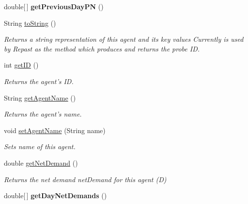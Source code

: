\begin{DoxyCompactItemize}
\item 
\hypertarget{classuk_1_1ac_1_1dmu_1_1iesd_1_1cascade_1_1agents_1_1aggregators_1_1_aggregator_agent_a618520742f384192175c0b895baf9ce1}{double\mbox{[}$\,$\mbox{]} {\bfseries get\-Previous\-Day\-P\-N} ()}\label{classuk_1_1ac_1_1dmu_1_1iesd_1_1cascade_1_1agents_1_1aggregators_1_1_aggregator_agent_a618520742f384192175c0b895baf9ce1}

\item 
String \hyperlink{classuk_1_1ac_1_1dmu_1_1iesd_1_1cascade_1_1agents_1_1aggregators_1_1_aggregator_agent_a7c0306e4c7407892f58fc488b4fed355}{to\-String} ()
\begin{DoxyCompactList}\small\item\em Returns a string representation of this agent and its key values Currently is used by Repast as the method which produces and returns the probe I\-D. \end{DoxyCompactList}\item 
int \hyperlink{classuk_1_1ac_1_1dmu_1_1iesd_1_1cascade_1_1agents_1_1aggregators_1_1_aggregator_agent_ab79960bbcbd0f5794d4523a9e06f6e3c}{get\-I\-D} ()
\begin{DoxyCompactList}\small\item\em Returns the agent's I\-D. \end{DoxyCompactList}\item 
String \hyperlink{classuk_1_1ac_1_1dmu_1_1iesd_1_1cascade_1_1agents_1_1aggregators_1_1_aggregator_agent_ae5f3110348394ae87691c08551da8836}{get\-Agent\-Name} ()
\begin{DoxyCompactList}\small\item\em Returns the agent's name. \end{DoxyCompactList}\item 
void \hyperlink{classuk_1_1ac_1_1dmu_1_1iesd_1_1cascade_1_1agents_1_1aggregators_1_1_aggregator_agent_af9289dddcf5d5f50f38a90d19981e211}{set\-Agent\-Name} (String name)
\begin{DoxyCompactList}\small\item\em Sets name of this agent. \end{DoxyCompactList}\item 
double \hyperlink{classuk_1_1ac_1_1dmu_1_1iesd_1_1cascade_1_1agents_1_1aggregators_1_1_aggregator_agent_a0662c0411a9442863a630df5ba5c56b3}{get\-Net\-Demand} ()
\begin{DoxyCompactList}\small\item\em Returns the net demand {\ttfamily net\-Demand} for this agent (D) \end{DoxyCompactList}\item 
\hypertarget{classuk_1_1ac_1_1dmu_1_1iesd_1_1cascade_1_1agents_1_1aggregators_1_1_aggregator_agent_afccfd94ca4df1718c488b105684236de}{double\mbox{[}$\,$\mbox{]} {\bfseries get\-Day\-Net\-Demands} ()}\label{classuk_1_1ac_1_1dmu_1_1iesd_1_1cascade_1_1agents_1_1aggregators_1_1_aggregator_agent_afccfd94ca4df1718c488b105684236de}


\end{DoxyCompactItemize}
